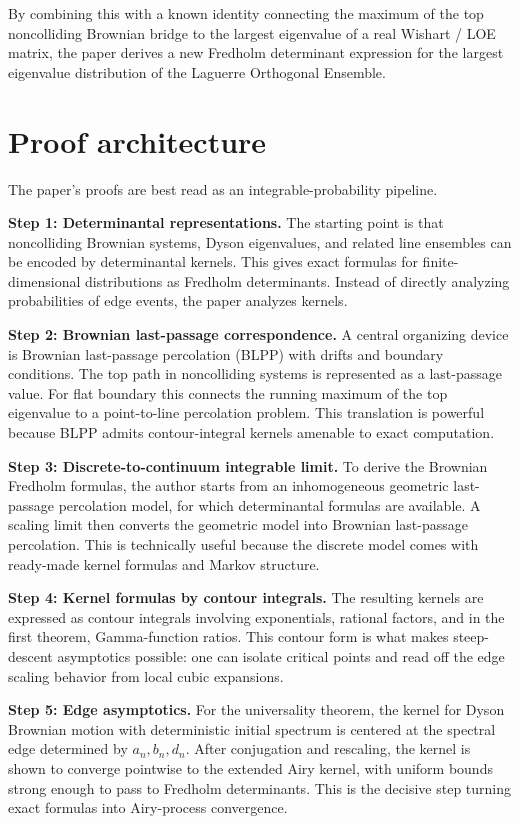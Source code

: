 \documentclass[11pt]{article}
\begin{document}
By combining this with a known identity connecting the maximum of the top noncolliding Brownian bridge to the largest eigenvalue of a real Wishart / LOE matrix, the paper derives a new Fredholm determinant expression for the largest eigenvalue distribution of the Laguerre Orthogonal Ensemble.

\section*{Proof architecture}
The paper's proofs are best read as an integrable-probability pipeline.

\textbf{Step 1: Determinantal representations.} The starting point is that noncolliding Brownian systems, Dyson eigenvalues, and related line ensembles can be encoded by determinantal kernels. This gives exact formulas for finite-dimensional distributions as Fredholm determinants. Instead of directly analyzing probabilities of edge events, the paper analyzes kernels.

\textbf{Step 2: Brownian last-passage correspondence.} A central organizing device is Brownian last-passage percolation (BLPP) with drifts and boundary conditions. The top path in noncolliding systems is represented as a last-passage value. For flat boundary this connects the running maximum of the top eigenvalue to a point-to-line percolation problem. This translation is powerful because BLPP admits contour-integral kernels amenable to exact computation.

\textbf{Step 3: Discrete-to-continuum integrable limit.} To derive the Brownian Fredholm formulas, the author starts from an inhomogeneous geometric last-passage percolation model, for which determinantal formulas are available. A scaling limit then converts the geometric model into Brownian last-passage percolation. This is technically useful because the discrete model comes with ready-made kernel formulas and Markov structure.

\textbf{Step 4: Kernel formulas by contour integrals.} The resulting kernels are expressed as contour integrals involving exponentials, rational factors, and in the first theorem, Gamma-function ratios. This contour form is what makes steep-descent asymptotics possible: one can isolate critical points and read off the edge scaling behavior from local cubic expansions.

\textbf{Step 5: Edge asymptotics.} For the universality theorem, the kernel for Dyson Brownian motion with deterministic initial spectrum is centered at the spectral edge determined by $a_n,b_n,d_n$. After conjugation and rescaling, the kernel is shown to converge pointwise to the extended Airy kernel, with uniform bounds strong enough to pass to Fredholm determinants. This is the decisive step turning exact formulas into Airy-process convergence.
\end{document}
